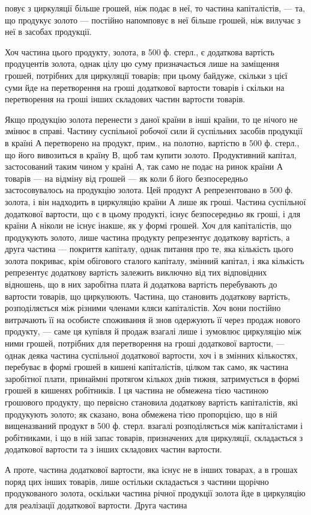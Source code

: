 повує з циркуляції більше грошей, ніж подає в неї, то частина капіталістів,
— та, що продукує золото — постійно напомповує в неї більше
грошей, ніж вилучає з неї в засобах продукції.

Хоч частина цього продукту, золота, в 500 ф. стерл., є додаткова
вартість продуцентів золота, однак цілу цю суму призначається лише на
заміщення грошей, потрібних для циркуляції товарів; при цьому байдуже,
скільки з цієї суми йде на перетворення на гроші додаткової вартости
товарів і скільки на перетворення на гроші інших складових частин
вартости товарів.

Якщо продукцію золота перенести з даної країни в інші країни, то
це нічого не змінює в справі. Частину суспільної робочої сили й суспільних
засобів продукції в країні А перетворено на продукт, прим., на
полотно, вартістю в 500 ф. стерл., що його вивозиться в країну В, щоб
там купити золото. Продуктивний капітал, застосований таким чином у
країні А, так само не подає на ринок країни А товарів — на відміну
від грошей — як коли б його безпосередньо застосовувалось на продукцію
золота. Цей продукт А репрезентовано в 500 ф. золота, і він
надходить в циркуляцію країни А лише як гроші. Частина суспільної
додаткової вартости, що є в цьому продукті, існує безпосередньо як
гроші, і для країни А ніколи не існує інакше, як у формі грошей. Хоч
для капіталістів, що продукують золото, лише частина продукту репрезентує
додаткову вартість, а друга частина — покриття капіталу, однак питання
про те, яка кількість цього золота покриває, крім обігового сталого
капіталу, змінний капітал, і яка кількість репрезентує додаткову
вартість залежить виключно від тих відповідних відношень,
що в них заробітна плата й додаткова вартість перебувають до
вартости товарів, що циркулюють. Частина, що становить додаткову
вартість, розподіляється між різними членами кляси капіталістів. Хоч
вони постійно витрачають її на особисте споживання й знов одержують
її через продаж нового продукту, — саме ця купівля й продаж взагалі
лише і зумовлює циркуляцію між ними грошей, потрібних для перетворення
на гроші додаткової вартости, — однак деяка частина суспільної
додаткової вартости, хоч і в змінних кількостях, перебуває в формі
грошей в кишені капіталістів, цілком так само, як частина заробітної
плати, принаймні протягом кількох днів тижня, затримується в формі грошей
в кишенях робітників. І ця частина не обмежена тією частиною грошового
продукту, що первісно становила додаткову вартість капіталістів, які
продукують золото; як сказано, вона обмежена тією пропорцією, що в
ній вищеназваний продукт в 500 ф. стерл. взагалі розподіляється між
капіталістами і робітниками, і що в ній запас товарів, призначених для
циркуляції, складається з додаткової вартости та з інших складових частин
вартости.

А проте, частина додаткової вартости, яка існує не в інших товарах,
а в грошах поряд цих інших товарів, лише остільки складається з частини
щорічно продукованого золота, оскільки частина річної продукції золота
йде в циркуляцію для реалізації додаткової вартости. Друга частина
